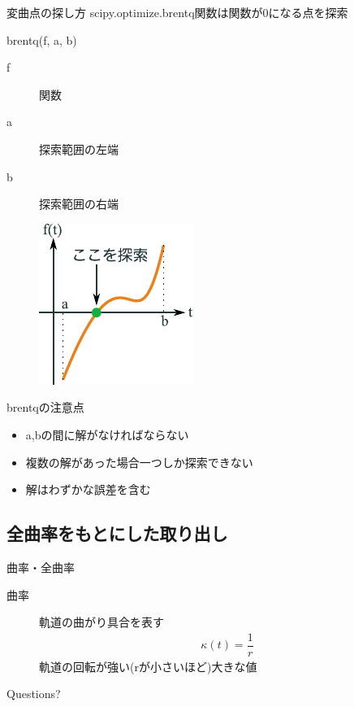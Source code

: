 \documentclass[12pt, xetex, xcolor=pdftex, dvipsnames]{beamer}
\begin{document}
\begin{frame}{変曲点の探し方}
    scipy.optimize.brentq関数は関数が0になる点を探索

    \begin{minipage}{0.5\hsize}
        \begin{block}{brentq(f, a, b)}
            \begin{description}
                \item[f] 関数
                \item[a] 探索範囲の左端
                \item[b] 探索範囲の右端
            \end{description}
        \end{block}
    \end{minipage}\begin{minipage}{0.5\hsize}
        \begin{figure}
            \centering
            \includegraphics[width=0.8\hsize]{img/brentq.pdf}
        \end{figure}
    \end{minipage}
\end{frame}
\begin{frame}{brentqの注意点}
    \begin{itemize}
        \item a,bの間に解がなければならない
        \item 複数の解があった場合一つしか探索できない
        \item 解はわずかな誤差を含む
    \end{itemize}
\end{frame}

\subsection{全曲率をもとにした取り出し}
\begin{frame}{曲率・全曲率}
  \begin{description}
    \item[曲率] 軌道の曲がり具合を表す
    \begin{align}
      \kappa(t) = \dfrac{1}{r}
    \end{align}
      軌道の回転が強い(rが小さいほど)大きな値
  \end{description}
\end{frame}

\begin{frame}[standout]
  Questions?
\end{frame}
\end{document}
